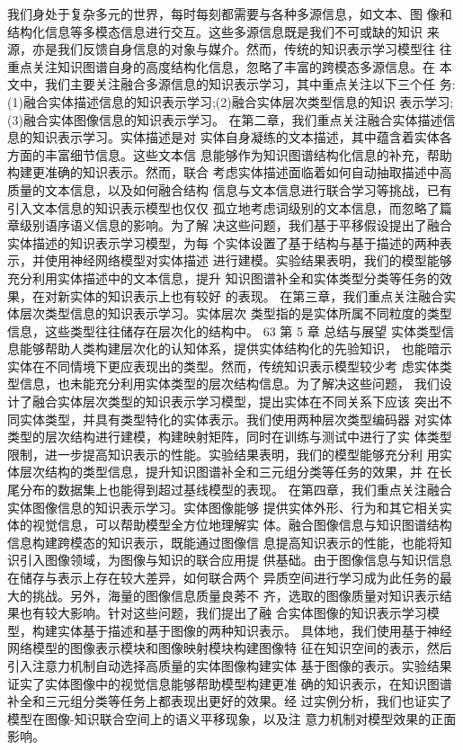 我们身处于复杂多元的世界，每时每刻都需要与各种多源信息，如文本、图 像和结构化信息等多模态信息进行交互。这些多源信息既是我们不可或缺的知识 来源，亦是我们反馈自身信息的对象与媒介。然而，传统的知识表示学习模型往 往重点关注知识图谱自身的高度结构化信息，忽略了丰富的跨模态多源信息。在 本文中，我们主要关注融合多源信息的知识表示学习，其中重点关注以下三个任 务:(1)融合实体描述信息的知识表示学习;(2)融合实体层次类型信息的知识 表示学习;(3)融合实体图像信息的知识表示学习。
在第二章，我们重点关注融合实体描述信息的知识表示学习。实体描述是对 实体自身凝练的文本描述，其中蕴含着实体各方面的丰富细节信息。这些文本信 息能够作为知识图谱结构化信息的补充，帮助构建更准确的知识表示。然而，联合 考虑实体描述面临着如何自动抽取描述中高质量的文本信息，以及如何融合结构 信息与文本信息进行联合学习等挑战，已有引入文本信息的知识表示模型也仅仅 孤立地考虑词级别的文本信息，而忽略了篇章级别语序语义信息的影响。为了解 决这些问题，我们基于平移假设提出了融合实体描述的知识表示学习模型，为每 个实体设置了基于结构与基于描述的两种表示，并使用神经网络模型对实体描述 进行建模。实验结果表明，我们的模型能够充分利用实体描述中的文本信息，提升 知识图谱补全和实体类型分类等任务的效果，在对新实体的知识表示上也有较好 的表现。
在第三章，我们重点关注融合实体层次类型信息的知识表示学习。实体层次 类型指的是实体所属不同粒度的类型信息，这些类型往往储存在层次化的结构中。
63
第 5 章 总结与展望
 实体类型信息能够帮助人类构建层次化的认知体系，提供实体结构化的先验知识， 也能暗示实体在不同情境下更应表现出的类型。然而，传统知识表示模型较少考 虑实体类型信息，也未能充分利用实体类型的层次结构信息。为了解决这些问题， 我们设计了融合实体层次类型的知识表示学习模型，提出实体在不同关系下应该 突出不同实体类型，并具有类型特化的实体表示。我们使用两种层次类型编码器 对实体类型的层次结构进行建模，构建映射矩阵，同时在训练与测试中进行了实 体类型限制，进一步提高知识表示的性能。实验结果表明，我们的模型能够充分利 用实体层次结构的类型信息，提升知识图谱补全和三元组分类等任务的效果，并 在长尾分布的数据集上也能得到超过基线模型的表现。
在第四章，我们重点关注融合实体图像信息的知识表示学习。实体图像能够 提供实体外形、行为和其它相关实体的视觉信息，可以帮助模型全方位地理解实 体。融合图像信息与知识图谱结构信息构建跨模态的知识表示，既能通过图像信 息提高知识表示的性能，也能将知识引入图像领域，为图像与知识的联合应用提 供基础。由于图像信息与知识信息在储存与表示上存在较大差异，如何联合两个 异质空间进行学习成为此任务的最大的挑战。另外，海量的图像信息质量良莠不 齐，选取的图像质量对知识表示结果也有较大影响。针对这些问题，我们提出了融 合实体图像的知识表示学习模型，构建实体基于描述和基于图像的两种知识表示。 具体地，我们使用基于神经网络模型的图像表示模块和图像映射模块构建图像特 征在知识空间的表示，然后引入注意力机制自动选择高质量的实体图像构建实体 基于图像的表示。实验结果证实了实体图像中的视觉信息能够帮助模型构建更准 确的知识表示，在知识图谱补全和三元组分类等任务上都表现出更好的效果。经 过实例分析，我们也证实了模型在图像-知识联合空间上的语义平移现象，以及注 意力机制对模型效果的正面影响。